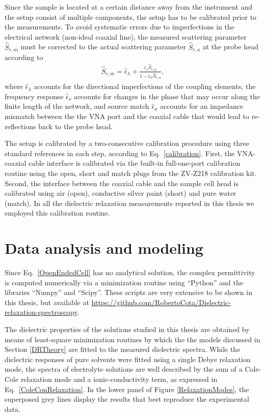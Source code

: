 Since the sample is located at a certain distance away from the instrument and the setup consist of multiple components, the setup has to be calibrated prior to the measurements. To avoid systematic errors due to imperfections in the electrical network (non-ideal coaxial line), the measured scattering parameter $\hat{S}_{r,m}$ must be corrected to the actual scattering parameter $\hat{S}_{r,a}$ at the probe head according to
\begin{eqnarray}
\hat{S}_{r,m} = \hat{\epsilon}_\lambda + \frac{\hat{\epsilon}_\nu \hat{S}_{r,a}}{1 - \hat{\epsilon}_\sigma \hat{S}_{r,a}},
\label{calibration}
\end{eqnarray}
where $\hat{\epsilon}_\lambda$ accounts for the directional imperfections of the coupling elements, the frequency response $\hat{\epsilon}_\nu$ accounts for changes in the phase that may occur along the finite length of the network, and source match $\hat{\epsilon}_\sigma$ accounts for an impedance mismatch between the the VNA port and the coaxial cable that would lead to re-reflections back to the probe head.



The setup is calibrated by a two-consecutive calibration procedure using three standard references in each step, according to Eq.\ \ref{calibration}. First, the VNA-coaxial cable interface is calibrated via the built-in full-one-port calibration routine using the open, short and match plugs from the ZV-Z218 calibration kit. Second, the interface between the coaxial cable and the sample cell head is calibrated using air (open), conductive silver paint (short) and pure water (match). In all the dielectric relaxation measurements reported in this thesis we employed this calibration routine.



\section{Data analysis and modeling}


Since Eq.\ \ref{OpenEndedCell} has no analytical solution, the complex permittivity is computed numerically via a minimization routine using ``Python'' and the libraries ``Numpy'' and ``Scipy''. These scripts are very extensive to be shown in this thesis, but available at \href{https://github.com/RobertoCota/Dielectric-relaxation-spectroscopy}{https://github.com/RobertoCota/Dielectric-relaxation-spectroscopy}.



The dielectric properties of the solutions studied in this thesis are obtained by means of least-square minimization routines by which the the models discussed in Section \ref{DRTheory} are fitted to the measured dielectric spectra. While the dielectric responses of pure solvents were fitted using a single Debye relaxation mode, the spectra of electrolyte solutions are well described by the sum of a Cole-Cole relaxation mode and a ionic-conductivity term, as expressed in Eq.\ \ref{ColeConRelaxation}. In the lower panel of Figure \ref{RelaxationModes}, the superposed grey lines display the results that best reproduce the experimental data. 



